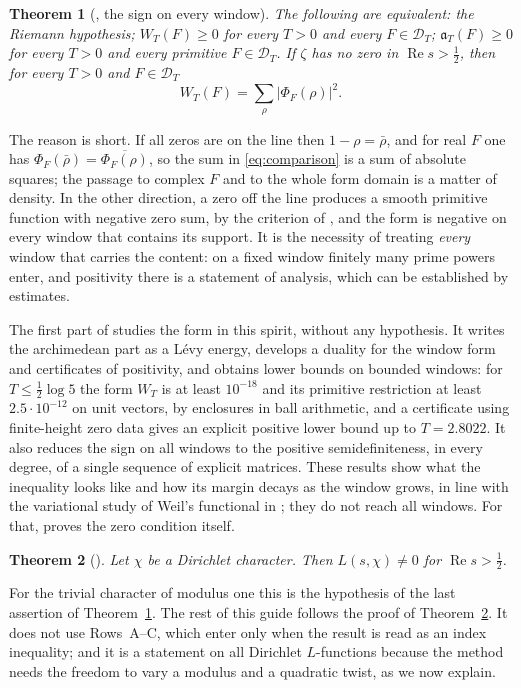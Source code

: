 \documentclass[10pt]{amsart}
\newtheorem{theorem}{Theorem}[section]
\theoremstyle{definition}
\theoremstyle{remark}
\newcommand{\Rel}{\operatorname{Re}}
\begin{document}
\begin{theorem}[{\cite{P46}}, the sign on every window]\label{thm:equiv}
The following are equivalent: the Riemann hypothesis; $W_T(F)\ge0$ for every $T>0$ and every
$F\in\mathcal D_T$; $\mathfrak a_T(F)\ge0$ for every $T>0$ and every primitive
$F\in\mathcal D_T$. If $\zeta$ has no zero in $\Rel s>\tfrac12$, then for every $T>0$ and
$F\in\mathcal D_T$
\[
 W_T(F)=\sum_\rho|\Phi_F(\rho)|^2 .
\]
\end{theorem}
The reason is short. If all zeros are on the line then $1-\rho=\bar\rho$, and for real $F$ one
has $\Phi_F(\bar\rho)=\overline{\Phi_F(\rho)}$, so the sum in \eqref{eq:comparison} is a sum of
absolute squares; the passage to complex $F$ and to the whole form domain is a matter of
density. In the other direction, a zero off the line produces a smooth primitive function with
negative zero sum, by the criterion of \cite{Paper45}, and the form is negative on every window
that contains its support. It is the necessity of treating \emph{every} window that carries the
content: on a fixed window finitely many prime powers enter, and positivity there is a
statement of analysis, which can be established by estimates.

The first part of \cite{P46} studies the form in this spirit, without any hypothesis. It writes
the archimedean part as a L\'evy energy, develops a duality for the window form and
certificates of positivity, and obtains lower bounds on bounded windows: for
$T\le\tfrac12\log5$ the form $W_T$ is at least $10^{-18}$ and its primitive restriction at least
$2.5\cdot10^{-12}$ on unit vectors, by enclosures in ball arithmetic, and a certificate using
finite-height zero data gives an explicit positive lower bound up to $T=2.8022$. It also reduces the sign on all windows to the positive
semidefiniteness, in every degree, of a single sequence of explicit matrices. These results
show what the inequality looks like and how its margin decays as the window grows, in line
with the variational study of Weil's functional in \cite{Yoshida1992,Bombieri2000,ConnesConsani2021};
they do not reach all windows. For that, \cite{P46} proves the zero condition itself.

\begin{theorem}[{\cite{P46}}]\label{thm:GRH}
Let $\chi$ be a Dirichlet character. Then $L(s,\chi)\ne0$ for $\Rel s>\tfrac12$.
\end{theorem}
For the trivial character of modulus one this is the hypothesis of the last assertion of
Theorem~\ref{thm:equiv}. The rest of this guide follows the proof of Theorem~\ref{thm:GRH}. It
does not use Rows~A--C, which enter only when the result is read as an index inequality; and it
is a statement on all Dirichlet $L$-functions because the method needs the freedom to vary a
modulus and a quadratic twist, as we now explain.
\end{document}
